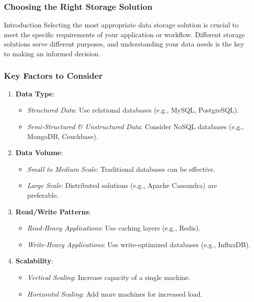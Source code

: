 \documentclass[aspectratio=169]{beamer}
\begin{document}
\begin{frame}[fragile]
    \frametitle{Choosing the Right Storage Solution}
    \begin{block}{Introduction}
        Selecting the most appropriate data storage solution is crucial to meet the specific requirements of your application or workflow. Different storage solutions serve different purposes, and understanding your data needs is the key to making an informed decision.
    \end{block}
\end{frame}

\begin{frame}[fragile]
    \frametitle{Key Factors to Consider}
    \begin{enumerate}
        \item \textbf{Data Type}:
            \begin{itemize}
                \item \textit{Structured Data}: Use relational databases (e.g., MySQL, PostgreSQL).
                \item \textit{Semi-Structured \& Unstructured Data}: Consider NoSQL databases (e.g., MongoDB, Couchbase).
            \end{itemize}
        \item \textbf{Data Volume}:
            \begin{itemize}
                \item \textit{Small to Medium Scale}: Traditional databases can be effective.
                \item \textit{Large Scale}: Distributed solutions (e.g., Apache Cassandra) are preferable.
            \end{itemize}
        \item \textbf{Read/Write Patterns}:
            \begin{itemize}
                \item \textit{Read-Heavy Applications}: Use caching layers (e.g., Redis).
                \item \textit{Write-Heavy Applications}: Use write-optimized databases (e.g., InfluxDB).
            \end{itemize}
        \item \textbf{Scalability}:
            \begin{itemize}
                \item \textit{Vertical Scaling}: Increase capacity of a single machine.
                \item \textit{Horizontal Scaling}: Add more machines for increased load.
            \end{itemize}
    \end{enumerate}
\end{frame}
\end{document}

